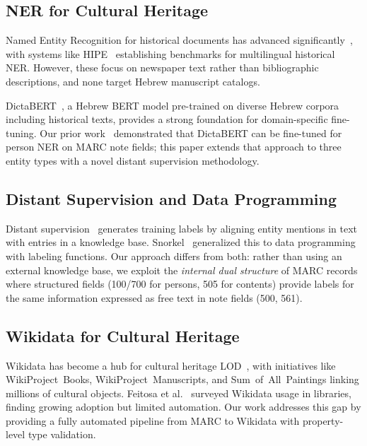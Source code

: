 \documentclass[Afour,sageh,times]{sagej}
\begin{document}
\subsection{NER for Cultural Heritage}

Named Entity Recognition for historical documents has advanced significantly~\cite{ehrmann2023named}, with systems like HIPE~\cite{ehrmann2022extended} establishing benchmarks for multilingual historical NER. However, these focus on newspaper text rather than bibliographic descriptions, and none target Hebrew manuscript catalogs.

DictaBERT~\cite{shmidman2023dictabert}, a Hebrew BERT model pre-trained on diverse Hebrew corpora including historical texts, provides a strong foundation for domain-specific fine-tuning. Our prior work~\cite{goldberg2025person} demonstrated that DictaBERT can be fine-tuned for person NER on MARC note fields; this paper extends that approach to three entity types with a novel distant supervision methodology.

\subsection{Distant Supervision and Data Programming}

Distant supervision~\cite{mintz2009distant} generates training labels by aligning entity mentions in text with entries in a knowledge base. Snorkel~\cite{ratner2017snorkel} generalized this to data programming with labeling functions. Our approach differs from both: rather than using an external knowledge base, we exploit the \emph{internal dual structure} of MARC records where structured fields (100/700 for persons, 505 for contents) provide labels for the same information expressed as free text in note fields (500, 561).

\subsection{Wikidata for Cultural Heritage}

Wikidata has become a hub for cultural heritage LOD~\cite{van2020wikidata}, with initiatives like WikiProject~Books, WikiProject~Manuscripts, and Sum~of~All~Paintings linking millions of cultural objects. Feitosa et al.~\cite{feitosa2023wikidata} surveyed Wikidata usage in libraries, finding growing adoption but limited automation. Our work addresses this gap by providing a fully automated pipeline from MARC to Wikidata with property-level type validation.
\end{document}
